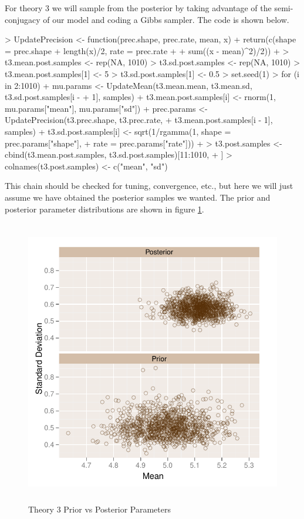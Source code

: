\documentclass[letterpaper,12pt]{article}
\begin{document}
For theory 3 we will sample from the posterior by taking advantage of
the semi-conjugacy of our model and coding a Gibbs sampler.  The code
is shown below.

\begin{Schunk}
\begin{Sinput}
> UpdatePrecision <- function(prec.shape, prec.rate, mean, x) {
+     return(c(shape = prec.shape + length(x)/2, rate = prec.rate + 
+         sum((x - mean)^2)/2))
+ }
> t3.mean.post.samples <- rep(NA, 1010)
> t3.sd.post.samples <- rep(NA, 1010)
> t3.mean.post.samples[1] <- 5
> t3.sd.post.samples[1] <- 0.5
> set.seed(1)
> for (i in 2:1010) {
+     mu.params <- UpdateMean(t3.mean.mean, t3.mean.sd, t3.sd.post.samples[i - 
+         1], samples)
+     t3.mean.post.samples[i] <- rnorm(1, mu.params["mean"], mu.params["sd"])
+     prec.params <- UpdatePrecision(t3.prec.shape, t3.prec.rate, 
+         t3.mean.post.samples[i - 1], samples)
+     t3.sd.post.samples[i] <- sqrt(1/rgamma(1, shape = prec.params["shape"], 
+         rate = prec.params["rate"]))
+ }
> t3.post.samples <- cbind(t3.mean.post.samples, t3.sd.post.samples)[11:1010, 
+     ]
> colnames(t3.post.samples) <- c("mean", "sd")
\end{Sinput}
\end{Schunk}

\noindent This chain should be checked for tuning, convergence, etc.,
but here we will just assume we have obtained the posterior samples we
wanted.  The prior and posterior parameter distributions are shown in
figure \ref{parameter comparison}.

\begin{figure}\begin{center}\includegraphics[width=12.5cm,height=12.5cm]{favir-graphs/pcomp_plot.pdf}\caption{Theory 3 Prior vs Posterior Parameters}\label{parameter comparison}\end{center}\end{figure}
\end{document}
